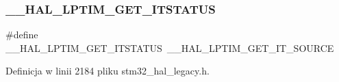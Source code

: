 \subsubsection{\texorpdfstring{\+\_\+\+\_\+\+H\+A\+L\+\_\+\+L\+P\+T\+I\+M\+\_\+\+G\+E\+T\+\_\+\+I\+T\+S\+T\+A\+T\+US}{\_\_HAL\_LPTIM\_GET\_ITSTATUS}}
{\footnotesize\ttfamily \#define \+\_\+\+\_\+\+H\+A\+L\+\_\+\+L\+P\+T\+I\+M\+\_\+\+G\+E\+T\+\_\+\+I\+T\+S\+T\+A\+T\+US~\+\_\+\+\_\+\+H\+A\+L\+\_\+\+L\+P\+T\+I\+M\+\_\+\+G\+E\+T\+\_\+\+I\+T\+\_\+\+S\+O\+U\+R\+CE}



Definicja w linii 2184 pliku stm32\+\_\+hal\+\_\+legacy.\+h.

